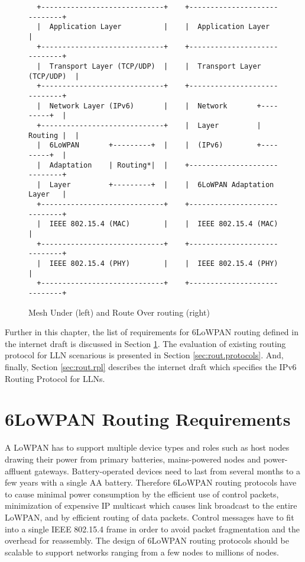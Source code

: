 \begin{figure}[htp]
\begin{mylisting}
\begin{verbatim}
  +-----------------------------+    +-----------------------------+
  |  Application Layer          |    |  Application Layer          |
  +-----------------------------+    +-----------------------------+
  |  Transport Layer (TCP/UDP)  |    |  Transport Layer (TCP/UDP)  |
  +-----------------------------+    +-----------------------------+
  |  Network Layer (IPv6)       |    |  Network       +---------+  |
  +-----------------------------+    |  Layer         | Routing |  |
  |  6LoWPAN       +---------+  |    |  (IPv6)        +---------+  |
  |  Adaptation    | Routing*|  |    +-----------------------------+
  |  Layer         +---------+  |    |  6LoWPAN Adaptation Layer   |
  +-----------------------------+    +-----------------------------+
  |  IEEE 802.15.4 (MAC)        |    |  IEEE 802.15.4 (MAC)        |
  +-----------------------------+    +-----------------------------+
  |  IEEE 802.15.4 (PHY)        |    |  IEEE 802.15.4 (PHY)        |
  +-----------------------------+    +-----------------------------+
\end{verbatim}
\end{mylisting}
\caption{Mesh Under (left) and Route Over routing (right)}\label{fig:routing}
\end{figure}

Further in this chapter, the list of requirements for 6LoWPAN routing defined in the internet draft \cite{draft-routing-04} is discussed in Section \ref{sec:rout.req}. The evaluation of existing  routing protocol for LLN scenarious is presented in Section \ref{sec:rout.protocols}. And,  finally, Section \ref{sec:rout.rpl} describes the internet draft \cite{draft-rpl-04} which specifies the IPv6 Routing Protocol for LLNs.

\section{6LoWPAN Routing Requirements}\label{sec:rout.req}
A LoWPAN has to support multiple device types and roles such as host nodes drawing their power from primary batteries, mains-powered nodes and power-affluent gateways. Battery-operated devices need to last from several months to a few years with a single AA battery. Therefore 6LoWPAN routing protocols have to cause minimal power consumption by the efficient use of control packets, minimization of expensive IP multicast which causes link broadcast to the entire LoWPAN, and by  efficient routing of data packets. Control messages have to fit into a single IEEE 802.15.4 frame in order to avoid packet fragmentation and the overhead for reassembly. The design of 6LoWPAN routing protocols should be scalable to support networks ranging from a few nodes to millions of nodes.


